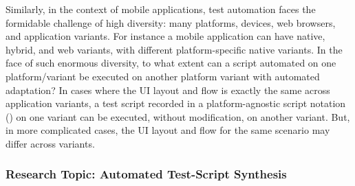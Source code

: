 Similarly, in the context of mobile applications, test automation faces the
formidable challenge of high diversity: many platforms, devices, web browsers,
and application variants. For instance a mobile application can have native,
hybrid, and web variants, with different platform-specific native variants. In
the face of such enormous diversity, to what extent can a script automated on
one platform/variant be executed on another platform variant with automated
adaptation?  In cases where the UI layout and flow is exactly the same across
application variants, a test script recorded in a platform-agnostic script
notation (\eg \cite{PerfectoScriptOnce}) on one variant can be executed, without
modification, on another variant.  But, in more complicated cases, the UI layout
and flow for the same scenario may differ across variants.




\vskip -9pt
\subsubsection*{Research Topic: Automated Test-Script Synthesis}

